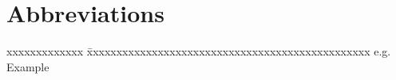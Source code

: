 \chapter*{Abbreviations}\label{Abbreviations} 

\begin{tabbing}
xxxxxxxxxxxxx \= xxxxxxxxxxxxxxxxxxxxxxxxxxxxxxxxxxxxxxxxxxxxxxxx \kill
e.g. \> Example\\

\end{tabbing}
